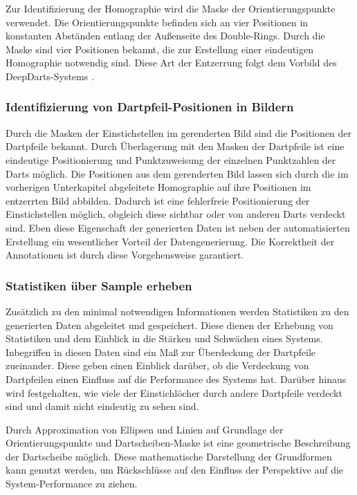 Zur Identifizierung der Homographie wird die Maske der Orientierungspunkte verwendet. Die Orientierungspunkte befinden sich an vier Positionen in konstanten Abständen entlang der Außenseite des Double-Rings. Durch die Maske sind vier Positionen bekannt, die zur Erstellung einer eindeutigen Homographie notwendig sind. Diese Art der Entzerrung folgt dem Vorbild des DeepDarts-Systems \cite{deepdarts}.

\subsubsection{Identifizierung von Dartpfeil-Positionen in Bildern}

Durch die Masken der Einstichstellen im gerenderten Bild sind die Positionen der Dartpfeile bekannt. Durch Überlagerung mit den Masken der Dartpfeile ist eine eindeutige Positionierung und Punktzuweisung der einzelnen Punktzahlen der Darts möglich. Die Positionen aus dem gerenderten Bild lassen sich durch die im vorherigen Unterkapitel abgeleitete Homographie auf ihre Positionen im entzerrten Bild abbilden. Dadurch ist eine fehlerfreie Positionierung der Einstichstellen möglich, obgleich diese sichtbar oder von anderen Darts verdeckt sind. Eben diese Eigenschaft der generierten Daten ist neben der automatisierten Erstellung ein wesentlicher Vorteil der Datengenerierung. Die Korrektheit der Annotationen ist durch diese Vorgehensweise garantiert.

\subsubsection{Statistiken über Sample erheben}

Zusätzlich zu den minimal notwendigen Informationen werden Statistiken zu den generierten Daten abgeleitet und gespeichert. Diese dienen der Erhebung von Statistiken und dem Einblick in die Stärken und Schwächen eines Systems. Inbegriffen in diesen Daten sind ein Maß zur Überdeckung der Dartpfeile zueinander. Diese geben einen Einblick darüber, ob die Verdeckung von Dartpfeilen einen Einfluss auf die Performance des Systems hat. Darüber hinaus wird festgehalten, wie viele der Einstichlöcher durch andere Dartpfeile verdeckt sind und damit nicht eindeutig zu sehen sind.

Durch Approximation von Ellipsen und Linien auf Grundlage der Orientierungspunkte und Dartscheiben-Maske ist eine geometrische Beschreibung der Dartscheibe möglich. Diese mathematische Darstellung der Grundformen kann genutzt werden, um Rückschlüsse auf den Einfluss der Perspektive auf die System-Performance zu ziehen.

